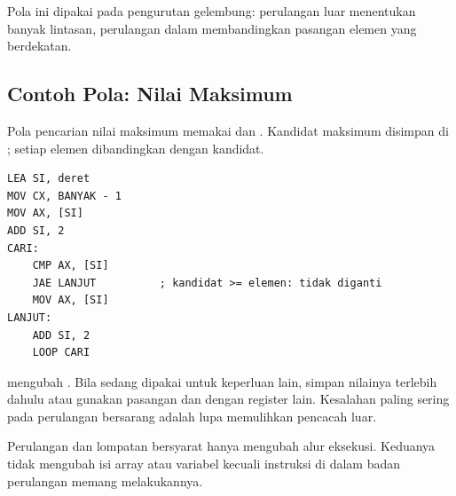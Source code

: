 Pola ini dipakai pada pengurutan gelembung: perulangan luar
menentukan banyak lintasan, perulangan dalam membandingkan pasangan
elemen yang berdekatan.

\subsection{Contoh Pola: Nilai Maksimum}

Pola pencarian nilai maksimum memakai  dan .
Kandidat maksimum disimpan di ; setiap elemen dibandingkan
dengan kandidat.

\begin{lstlisting}[language=MASM, numbers=none]
LEA SI, deret
MOV CX, BANYAK - 1
MOV AX, [SI]
ADD SI, 2
CARI:
    CMP AX, [SI]
    JAE LANJUT          ; kandidat >= elemen: tidak diganti
    MOV AX, [SI]
LANJUT:
    ADD SI, 2
    LOOP CARI
\end{lstlisting}

\begin{peringatanbox}
\vspace{1.1em}
 mengubah . Bila  sedang dipakai untuk
keperluan lain, simpan nilainya terlebih dahulu atau gunakan
pasangan  dan  dengan register lain. Kesalahan
paling sering pada perulangan bersarang adalah lupa memulihkan
pencacah luar.
\end{peringatanbox}

\begin{infobox}
\vspace{1.1em}
Perulangan  dan lompatan bersyarat hanya mengubah alur
eksekusi. Keduanya tidak mengubah isi array atau variabel kecuali
instruksi di dalam badan perulangan memang melakukannya.
\end{infobox}
